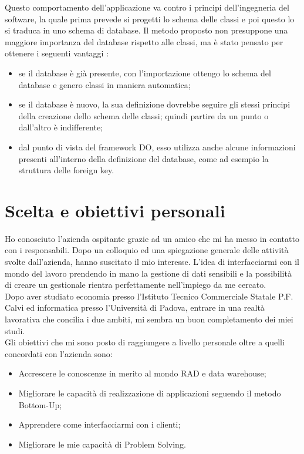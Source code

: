 Questo comportamento dell'applicazione va contro i principi dell'ingegneria del software, la quale prima prevede si progetti lo schema delle classi e poi questo lo si traduca in uno schema di database. Il metodo proposto non presuppone una maggiore importanza del database rispetto alle classi, ma è stato pensato per ottenere i seguenti vantaggi \hyperref[bib11]{\cite{[11]}}:
\begin{itemize}
	\item se il database è già presente, con l'importazione ottengo lo schema del database e genero classi in maniera automatica;
	\item se il database è nuovo, la sua definizione dovrebbe seguire gli stessi principi della	creazione dello schema delle classi; quindi partire da un punto o dall'altro è indifferente;
	\item dal punto di vista del framework DO, esso utilizza anche alcune informazioni presenti all'interno della definizione del database, come ad esempio la struttura delle
	foreign key.
\end{itemize}


\section{Scelta e obiettivi personali}\label{scelta e obiettivi}
Ho conosciuto l'azienda ospitante grazie ad un amico che mi ha messo in contatto con i responsabili. Dopo un colloquio ed una spiegazione generale delle attività svolte dall'azienda, hanno suscitato il mio interesse. L'idea di interfacciarmi con il mondo del lavoro prendendo in mano la gestione di dati sensibili e la possibilità di creare un gestionale rientra perfettamente nell'impiego da me cercato.\\
Dopo aver studiato economia presso l'Istituto Tecnico Commerciale Statale P.F. Calvi ed informatica presso l'Università di Padova, entrare in una realtà lavorativa che concilia i due ambiti, mi sembra un buon completamento dei miei studi.\\
Gli obiettivi che mi sono posto di raggiungere a livello personale oltre a quelli concordati con l'azienda sono: 
\begin{itemize}
	\item Accrescere le conoscenze in merito al mondo RAD e data warehouse;
	\item Migliorare le capacità di realizzazione di applicazioni seguendo il metodo Bottom-Up;
	\item Apprendere come interfacciarmi con i clienti;
	\item Migliorare le mie capacità di Problem Solving.
\end{itemize}

\newpage
